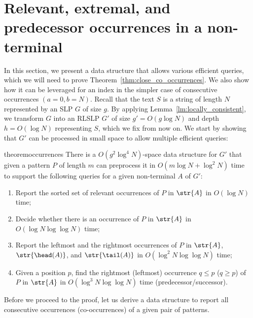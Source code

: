 \section{Relevant, extremal, and predecessor occurrences in a non-terminal}
\label{indexgapped:sec:occurrences}
In this section, we present a data structure that allows various efficient queries, which we will need to prove Theorem~\ref{thm:close_co_occurrences}.
We also show how it can be leveraged for an index in the simpler case of consecutive occurrences $(a = 0, b = N)$. 
Recall that the text $S$ is a string of length $N$ represented by an SLP $G$ of size $g$. By applying Lemma~\ref{lm:locally_consistent}, we transform $G$ into an RLSLP $G'$ of size $g' = O(g \log N)$ and depth $h = O(\log N)$ representing $S$, which we fix from now on. We start by showing that $G'$ can be processed in small space to allow multiple efficient queries:

\begin{restatable}{theorem}{occurrences}\label{th:occurrences}
There is a $O(g^2\log^4 N)$-space data structure for $G'$ that given a pattern $P$ of length $m$ can preprocess it in $O(m \log N + \log^2 N)$ time to support the following queries for a given non-terminal $A$ of $G'$:
\begin{enumerate}
\item Report the sorted set of relevant occurrences of $P$ in $\str{A}$ in $O(\log N)$ time;
\item Decide whether there is an occurrence of $P$ in $\str{A}$ in $O(\log N \log \log N)$ time;
\item Report the leftmost and the rightmost occurrences of $P$ in $\str{A}$, $\str{\head(A)}$, and $\str{\tail(A)}$ in $O(\log^2 N \log \log N)$ time;
\item Given a position $p$, find the rightmost (leftmost) occurrence $q \le p$ ($q \ge p$) of $P$ in $\str{A}$ in $O(\log^3 N \log \log N)$ time (predecessor/successor). 
\end{enumerate}
\end{restatable}
%
\noindent Before we proceed to the proof, let us derive a data structure to report all consecutive occurrences (co-occurrences) of a given pair of patterns.


